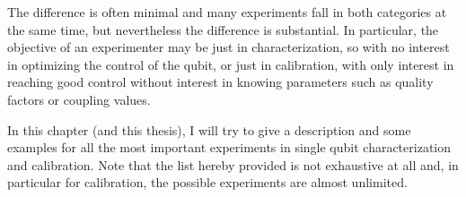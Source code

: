 
%
%

The difference is often minimal and many experiments fall in both categories at the same time, but nevertheless the difference is substantial.
In particular, the objective of an experimenter may be just in characterization, so with no interest in optimizing the control of the qubit, or just in calibration, with only interest in reaching good control without interest in knowing parameters such as quality factors or coupling values.

In this chapter (and this thesis), I will try to give a description and some examples for all the most important experiments in single qubit characterization and calibration.
Note that the list hereby provided is not exhaustive at all and, in particular for calibration, the possible experiments are almost unlimited.

